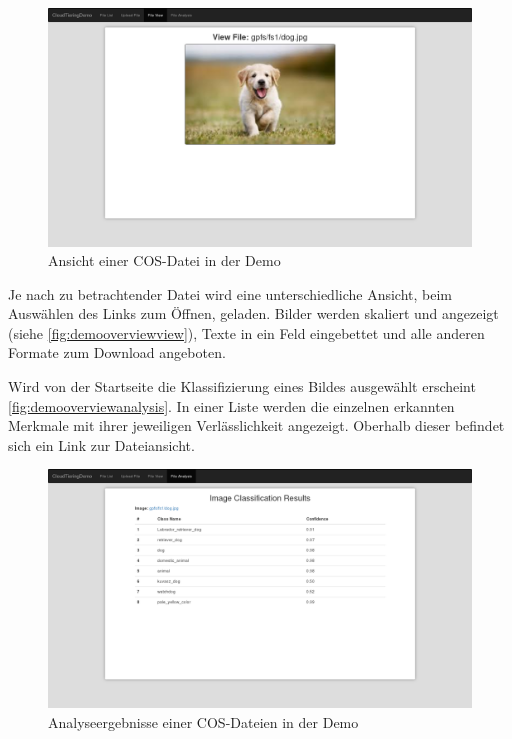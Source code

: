 \begin{figure}[hbt]
	\centering
	\includegraphics[scale=0.25]{images/demo-overview-view}
	\caption{Ansicht einer COS-Datei in der Demo}
	\label{fig:demooverviewview}
\end{figure}

Je nach zu betrachtender Datei wird eine unterschiedliche Ansicht, beim Auswählen des Links zum Öffnen, geladen. Bilder werden skaliert und angezeigt (siehe \autoref{fig:demooverviewview}), Texte in ein Feld eingebettet und alle anderen Formate zum Download angeboten.

Wird von der Startseite die Klassifizierung eines Bildes ausgewählt erscheint \autoref{fig:demooverviewanalysis}. In einer Liste werden die einzelnen erkannten Merkmale mit ihrer jeweiligen Verlässlichkeit angezeigt. Oberhalb dieser befindet sich ein Link zur Dateiansicht.
\begin{figure}[hbt]
	\centering
	\includegraphics[scale=0.25]{images/demo-overview-analysis}
	\caption{Analyseergebnisse einer COS-Dateien in der Demo}
	\label{fig:demooverviewanalysis}
\end{figure}

